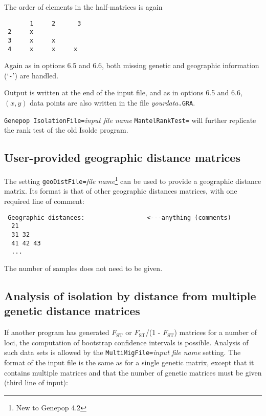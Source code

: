 \documentclass[
  12pt,
]{book}
\begin{document}
The order of elements in the half-matrices is again

\begin{verbatim}
       1     2      3
 2     x
 3     x     x
 4     x     x     x
\end{verbatim}

Again as in options 6.5 and 6.6, both missing genetic and geographic information (`\texttt{-}') are handled.

Output is written at the end of the input file, and as in options 6.5 and 6.6, \((x,y)\) data points are also written in the file \emph{yourdata}\texttt{.GRA}.

\texttt{Genepop\ IsolationFile=}\emph{input file name} \texttt{MantelRankTest=} will further replicate the rank test of the old Isolde program.

\hypertarget{user-provided-geographic-distance-matrices}{%
\subsection{User-provided geographic distance matrices}\label{user-provided-geographic-distance-matrices}}

The setting \texttt{geoDistFile=}\emph{file name}\footnote{New to Genepop 4.2} can be used to provide a geographic distance matrix. Its format is that of other geographic distances matrices, with one required line of comment:

\begin{verbatim}
 Geographic distances:                 <---anything (comments)
  21
  31 32
  41 42 43
  ...
\end{verbatim}

The number of samples does not need to be given.

\hypertarget{analysis-of-isolation-by-distance-from-multiple-genetic-distance-matrices}{%
\subsection{Analysis of isolation by distance from multiple genetic distance matrices}\label{analysis-of-isolation-by-distance-from-multiple-genetic-distance-matrices}}

If another program has generated \(F_{\mathrm{ST}}\) or \(F_{\mathrm{ST}}\)/(1 - \(F_{\mathrm{ST}}\)) matrices for a number of loci, the computation of bootstrap confidence intervals is possible. Analysis of such data sets is allowed by the \texttt{MultiMigFile=}\emph{input file name} setting. The format of the input file is the same as for a single genetic matrix, except that it contains multiple matrices and that the number of genetic matrices must be given (third line of input):
\end{document}
